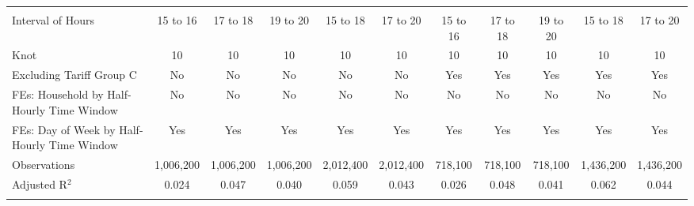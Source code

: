 \begin{table}[!htbp]
\begin{longtable}{@{\extracolsep{0pt}}lcccccccccc}
  & & & & & & & & & & \\ 
\hline \\[-1.8ex] 
Interval of Hours & 15 to 16 & 17 to 18 & 19 to 20 & 15 to 18 & 17 to 20 & 15 to 16 & 17 to 18 & 19 to 20 & 15 to 18 & 17 to 20 \\ 
Knot & 10 & 10 & 10 & 10 & 10 & 10 & 10 & 10 & 10 & 10 \\ 
Excluding Tariff Group C & No & No & No & No & No & Yes & Yes & Yes & Yes & Yes \\ 
FEs: Household by Half-Hourly Time Window & No & No & No & No & No & No & No & No & No & No \\ 
FEs: Day of Week by Half-Hourly Time Window & Yes & Yes & Yes & Yes & Yes & Yes & Yes & Yes & Yes & Yes \\ 
Observations & 1,006,200 & 1,006,200 & 1,006,200 & 2,012,400 & 2,012,400 & 718,100 & 718,100 & 718,100 & 1,436,200 & 1,436,200 \\ 
Adjusted R$^{2}$ & 0.024 & 0.047 & 0.040 & 0.059 & 0.043 & 0.026 & 0.048 & 0.041 & 0.062 & 0.044 \\ 
\hline 
\hline \\[-1.8ex] 
\end{longtable} 
\end{table} 
